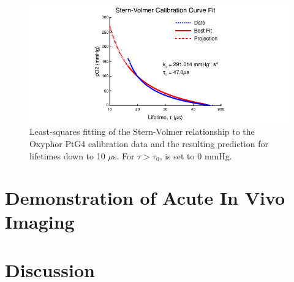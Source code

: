 \begin{figure}
    \includegraphics{figures/chapter_2/sternvolmerfit.pdf}
    \caption {
        \label{fig:sternvolmerfit}
        Least-squares fitting of the Stern-Volmer relationship to the Oxyphor PtG4 calibration data and the resulting prediction for lifetimes down to 10 $\mu$s. For $\tau > \tau_0$,  is set to 0 mmHg.
    }
\end{figure}



\section{Demonstration of Acute In Vivo Imaging}

\blindtext



\section{Discussion}

\blindtext



